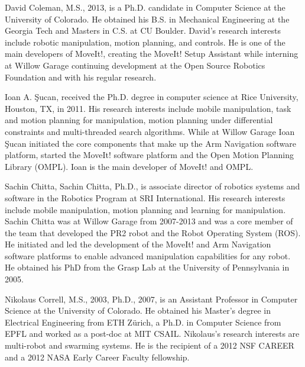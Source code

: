 \documentclass[10pt,journal,compsoc]{joser1}
\begin{document}
{%
\begin{IEEEbiography}[{coleman}]{David Coleman}, M.S., 2013, is a Ph.D. candidate in Computer Science at the University of Colorado. He obtained his B.S. in Mechanical Engineering at the Georgia Tech and Masters in C.S. at CU Boulder. David's research interests include robotic manipulation, motion planning, and controls. He is one of the main developers of MoveIt!, creating the MoveIt! Setup Assistant while interning at Willow Garage continuing development at the Open Source Robotics Foundation and with his regular research.
\end{IEEEbiography}

\begin{IEEEbiography}[{ioan}]{Ioan A. \c{S}ucan}, 
received the Ph.D. degree in computer science at Rice University,
Houston, TX, in 2011. His research interests include mobile
manipulation, task and motion planning for manipulation, motion
planning under differential constraints and multi-threaded search
algorithms. While at Willow Garage Ioan \c{S}ucan initiated the core
components that make up the Arm Navigation software platform, started
the MoveIt! software platform and the Open Motion Planning Library
(OMPL).  Ioan is the main developer of MoveIt! and OMPL.
\end{IEEEbiography}

\begin{IEEEbiography}[{}]{Sachin Chitta}, Sachin Chitta, Ph.D., is associate director of robotics systems and software in the Robotics Program at SRI International. His research interests include mobile manipulation, motion planning and learning for manipulation. Sachin Chitta was at Willow Garage from 2007-2013 and was a core member of the team that developed the PR2 robot and the Robot Operating System (ROS). He initiated and led the development of the MoveIt! and Arm Navigation software platforms to enable advanced manipulation capabilities for any robot. He obtained his PhD from the Grasp Lab at the University of Pennsylvania in 2005.  
\end{IEEEbiography}

\begin{IEEEbiography}[{nikolauscorrell}]{Nikolaus Correll}, M.S., 2003, Ph.D., 2007, is an Assistant Professor in Computer Science at the University of Colorado. He obtained his Master's degree in Electrical Engineering from ETH Z\"urich, a Ph.D. in Computer Science from EPFL and worked as a post-doc at MIT CSAIL. Nikolaus's research interests are multi-robot and swarming systems. He is the recipient of a 2012 NSF CAREER and a 2012 NASA Early Career Faculty fellowship.
\end{IEEEbiography}


}
\end{document}
